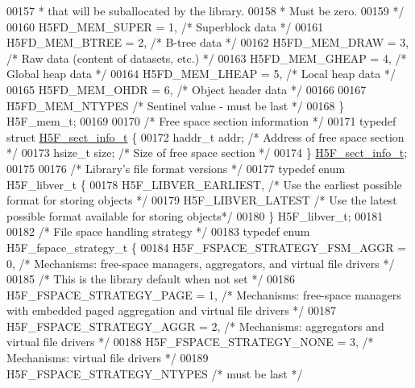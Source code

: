 \begin{DoxyCode}
00157 \textcolor{comment}{                                 * that will be suballocated by the library.}
00158 \textcolor{comment}{                                 * Must be zero.}
00159 \textcolor{comment}{                                 */}
00160     H5FD\_MEM\_SUPER      = 1,    \textcolor{comment}{/* Superblock data */}
00161     H5FD\_MEM\_BTREE      = 2,    \textcolor{comment}{/* B-tree data */}
00162     H5FD\_MEM\_DRAW       = 3,    \textcolor{comment}{/* Raw data (content of datasets, etc.) */}
00163     H5FD\_MEM\_GHEAP      = 4,    \textcolor{comment}{/* Global heap data */}
00164     H5FD\_MEM\_LHEAP      = 5,    \textcolor{comment}{/* Local heap data */}
00165     H5FD\_MEM\_OHDR       = 6,    \textcolor{comment}{/* Object header data */}
00166 
00167     H5FD\_MEM\_NTYPES             \textcolor{comment}{/* Sentinel value - must be last */}
00168 \} H5F\_mem\_t;
00169 
00170 \textcolor{comment}{/* Free space section information */}
00171 \textcolor{keyword}{typedef} \textcolor{keyword}{struct }\hyperlink{struct_h5_f__sect__info__t}{H5F\_sect\_info\_t} \{
00172     haddr\_t             addr;   \textcolor{comment}{/* Address of free space section */}
00173     hsize\_t             size;   \textcolor{comment}{/* Size of free space section */}
00174 \} \hyperlink{struct_h5_f__sect__info__t}{H5F\_sect\_info\_t};
00175 
00176 \textcolor{comment}{/* Library's file format versions */}
00177 \textcolor{keyword}{typedef} \textcolor{keyword}{enum} H5F\_libver\_t \{
00178     H5F\_LIBVER\_EARLIEST,        \textcolor{comment}{/* Use the earliest possible format for storing objects */}
00179     H5F\_LIBVER\_LATEST           \textcolor{comment}{/* Use the latest possible format available for storing objects*/}
00180 \} H5F\_libver\_t;
00181 
00182 \textcolor{comment}{/* File space handling strategy */}
00183 \textcolor{keyword}{typedef} \textcolor{keyword}{enum} H5F\_fspace\_strategy\_t \{
00184     H5F\_FSPACE\_STRATEGY\_FSM\_AGGR = 0,   \textcolor{comment}{/* Mechanisms: free-space managers, aggregators, and virtual file
       drivers */}
00185                                         \textcolor{comment}{/* This is the library default when not set */}
00186     H5F\_FSPACE\_STRATEGY\_PAGE = 1,   \textcolor{comment}{/* Mechanisms: free-space managers with embedded paged aggregation and
       virtual file drivers */}
00187     H5F\_FSPACE\_STRATEGY\_AGGR = 2,   \textcolor{comment}{/* Mechanisms: aggregators and virtual file drivers */}
00188     H5F\_FSPACE\_STRATEGY\_NONE = 3,   \textcolor{comment}{/* Mechanisms: virtual file drivers */}
00189     H5F\_FSPACE\_STRATEGY\_NTYPES      \textcolor{comment}{/* must be last */}

\end{DoxyCode}
